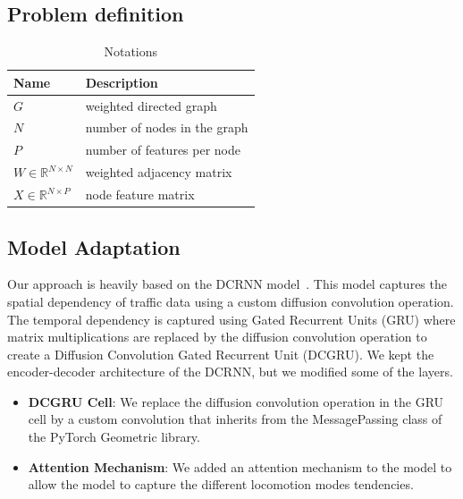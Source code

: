 \subsection{Problem definition}\label{subsec:problem-definition}


\begin{table}[htbp]
    \caption{Notations}
    \center
    \begin{tabular}{@{}ll@{}}
        \toprule
        \textbf{Name}                    & \textbf{Description}         \\
        \midrule
        $G$                              & weighted directed graph      \\
        $N$                              & number of nodes in the graph \\
        $P$                              & number of features per node  \\
        $W \in \mathbb{R}^{N \times N} $ & weighted adjacency matrix    \\
        $X \in \mathbb{R}^{N \times P} $ & node feature matrix          \\

        \bottomrule

    \end{tabular}
    \label{tab:notations}
\end{table}

\subsection{Model Adaptation}\label{subsec:model-adaptation}
Our approach is heavily based on the DCRNN model~\cite{DCRNN}.
This model captures the spatial dependency of traffic data using a custom diffusion convolution operation.
The temporal dependency is captured using Gated Recurrent Units (GRU) where matrix multiplications are replaced by
the diffusion convolution operation to create a Diffusion Convolution Gated Recurrent Unit (DCGRU).
We kept the encoder-decoder architecture of the DCRNN, but we modified some of the layers.

\begin{itemize}
    \item \textbf{DCGRU Cell}:
    We replace the diffusion convolution operation in the GRU cell by a custom convolution that inherits from the MessagePassing class of the PyTorch Geometric library.
    \item \textbf{Attention Mechanism}:
    We added an attention mechanism to the model to allow the model to capture the different locomotion modes tendencies.
\end{itemize}


